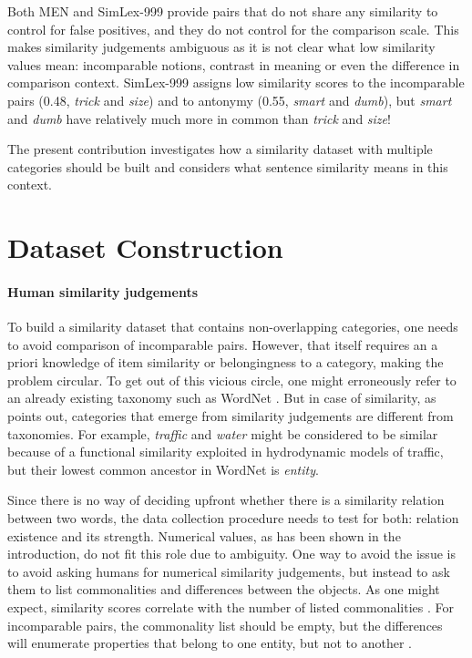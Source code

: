 \documentclass[11pt]{article}
\begin{document}
Both MEN and SimLex-999 provide pairs that do not share any similarity to control for false positives, and they do not control for the comparison scale. This makes similarity judgements ambiguous as it is not clear what low similarity values mean: incomparable notions, contrast in meaning or even the difference in comparison context. SimLex-999 assigns low similarity scores to the incomparable pairs (0.48, \textit{trick} and \textit{size}) and to antonymy (0.55, \textit{smart} and \textit{dumb}), but \textit{smart} and \textit{dumb} have relatively much more in common than \textit{trick} and \textit{size}!

The present contribution investigates how a similarity dataset with multiple categories should be built and considers what sentence similarity means in this context.

\section{Dataset Construction}

\paragraph{Human similarity judgements}

To build a similarity dataset that contains non-overlapping categories, one needs to avoid comparison of incomparable pairs. However, that itself requires an a priori knowledge of item similarity or belongingness to a category, making the problem circular. To get out of this vicious circle, one might erroneously  refer to an already existing taxonomy such as WordNet \cite{Miller:1995:WLD:219717.219748}. But in case of similarity, as  points out, categories that emerge from similarity judgements are different from taxonomies. For example, \textit{traffic} and \textit{water} might be considered to be similar because of a functional similarity exploited in hydrodynamic models of traffic, but their lowest common ancestor in WordNet is \textit{entity}.

Since there is no way of deciding upfront whether there is a similarity relation between two words, the data collection procedure needs to test for both: relation existence and its strength. Numerical values, as has been shown in the introduction, do not fit this role due to ambiguity. One way to avoid the issue is to avoid asking humans for numerical similarity judgements, but instead to ask them to list commonalities and differences between the objects. As one might expect, similarity scores correlate with the number of listed commonalities \cite{markman1991commonalities,Markman1996,medin1993respects}. For incomparable pairs, the commonality list should be empty, but the differences will enumerate properties that belong to one entity, but not to another \cite{markman1991commonalities,medin1993respects}. 
\end{document}
